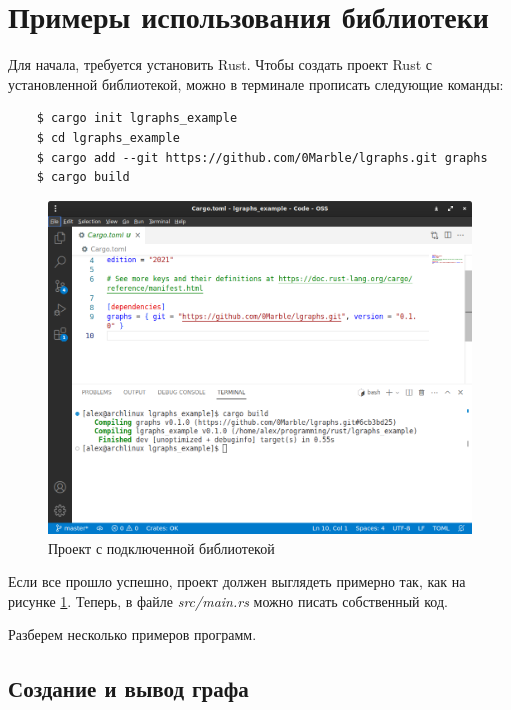 \section{Примеры использования библиотеки}

Для начала, требуется установить Rust. Чтобы создать проект Rust с установленной библиотекой,
можно в терминале прописать следующие команды:

\begin{verbatim}
    $ cargo init lgraphs_example
    $ cd lgraphs_example
    $ cargo add --git https://github.com/0Marble/lgraphs.git graphs
    $ cargo build
\end{verbatim}

\begin{figure}
    \centering
    \includegraphics[scale=0.4]{static_images/install_example.png}
    \caption{Проект с подключенной библиотекой}
    \label{project-setup-image}
\end{figure}

Если все прошло успешно, проект должен выглядеть примерно так, как на рисунке \ref{project-setup-image}.
Теперь, в файле \emph{src/main.rs} можно писать собственный код.

Разберем несколько примеров программ.

\subsection{Создание и вывод графа}

\inputminted[linenos]{rust}{../lgraphs/examples/helloworld.rs} \label{helloworld-program}

